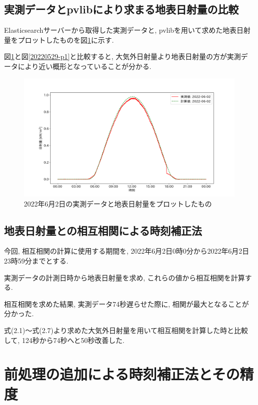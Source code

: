 \subsection{実測データとpvlibにより求まる地表日射量の比較}
Elasticsearchサーバーから取得した実測データと, pvlibを用いて求めた地表日射量をプロットしたものを図\ref{2-p1}に示す.

図\ref{2-p1}と図\ref{20220529-p1}と比較すると, 大気外日射量より地表日射量の方が実測データにより近い概形となっていることが分かる.

\begin{figure}[H]
  \begin{center}
    \includegraphics[width=160mm]{sotu/figure/2/pvlib-20220602-corr.png}
    \caption{2022年6月2日の実測データと地表日射量をプロットしたもの}
    \label{2-p1}
  \end{center}
\end{figure}

\subsection{地表日射量との相互相関による時刻補正法}
今回, 相互相関の計算に使用する期間を, 2022年6月2日0時0分から2022年6月2日23時59分までとする.

実測データの計測日時から地表日射量を求め, これらの値から相互相関を計算する.

相互相関を求めた結果, 実測データ74秒遅らせた際に, 相関が最大となることが分かった.

式(2.1)～式(2.7)より求めた大気外日射量を用いて相互相関を計算した時と比較して, 124秒から74秒へと50秒改善した.

\section{前処理の追加による時刻補正法とその精度}

